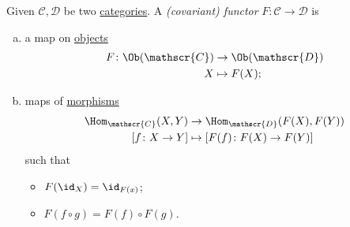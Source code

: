 \begin{definition}[Functor]\label{def:functor}
	Given \(\mathscr{C} , \mathscr{D} \) be two \hyperref[def:category]{categories}. A \emph{(covariant) functor} \(F\colon \mathscr{C} \to \mathscr{D}\) is
	\begin{enumerate}[(a)]
		\item a map on \hyperref[def:object]{objects}
		      \[
			      \begin{split}
				      F\colon \Ob(\mathscr{C} ) & \to \Ob(\mathscr{D} ) \\
				      X                         & \mapsto F(X);
			      \end{split}
		      \]
		\item maps of \hyperref[def:morphism]{morphisms}
		      \[
			      \begin{split}
				      \Hom_{\mathscr{C} }(X, Y)   & \to \Hom_{\mathscr{D} }(F(X), F(Y))          \\
				      \left[f\colon X\to Y\right] & \mapsto \left[F(f)\colon F(X)\to F(Y)\right]
			      \end{split}
		      \]
		      such that
		      \begin{itemize}
			      \item \(F(\id_{X} ) = \id_{F(x)} \);
			      \item \(F(f\circ g) = F(f)\circ F(g)\).
		      \end{itemize}
	\end{enumerate}
\end{definition}